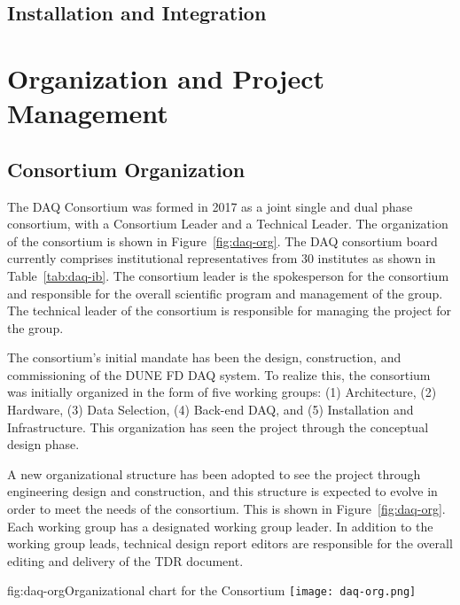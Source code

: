\subsection{Installation and Integration}

\section{Organization and Project Management}
\label{sec:daq:organization}

\subsection{Consortium Organization}

The DAQ Consortium was formed in 2017 as a joint single and dual phase
consortium, with a Consortium Leader and a Technical Leader.
The organization of the consortium is shown in Figure~\ref{fig:daq-org}.
The DAQ consortium board currently comprises institutional representatives from
30 institutes as shown in Table~\ref{tab:daq-ib}.
The consortium leader is the spokesperson for the consortium and responsible for
the overall scientific program and management of the group.
The technical leader of the consortium is responsible for managing the project
for the group.

The consortium's initial mandate has been the design, construction, and
commissioning of the DUNE FD DAQ system.
To realize this, the consortium was initially organized in the form of five
working groups: (1) Architecture, (2) Hardware, (3) Data Selection, (4) Back-end
DAQ, and (5) Installation and Infrastructure.
This organization has seen the project through the conceptual design phase.  

A new organizational structure has been adopted to see the project through
engineering design and construction, and this structure is expected to evolve in
order to meet the needs of the consortium.
This is shown in Figure~\ref{fig:daq-org}.
Each working group has a designated working group leader.
In addition to the working group leads, technical design report editors are
responsible for the overall editing and delivery of the TDR document.

\begin{dunefigure}{fig:daq-org}{Organizational chart for the  Consortium
 }
  \texttt{[image: daq-org.png]}
\end{dunefigure}

